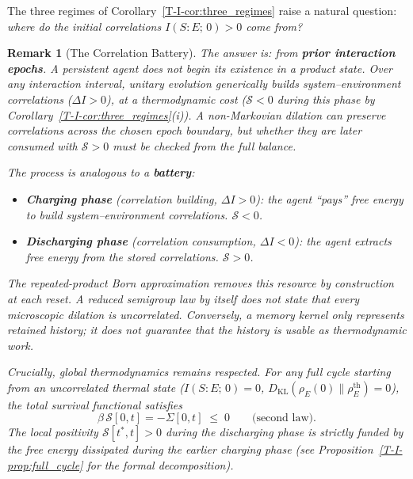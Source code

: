 \documentclass[12pt,a4paper,openany]{book}
\newtheorem{remark}[theorem]{Remark}
\begin{document}
The three regimes of Corollary~\ref{T-I-cor:three_regimes} raise a
natural question: \emph{where do the initial correlations
$I(S{:}E;\, 0) > 0$ come from?}

\begin{remark}[The Correlation Battery]
\label{T-I-rem:battery}
The answer is: from \textbf{prior interaction epochs}.
A persistent agent does not begin its existence in a product
state.
Over any interaction interval, unitary evolution generically
builds system--environment correlations ($\Delta I > 0$),
at a thermodynamic cost ($\mathcal{S} < 0$ during this
phase by Corollary~\ref{T-I-cor:three_regimes}(i)).
A non-Markovian dilation can preserve correlations across the chosen
epoch boundary, but whether they are later consumed with
$\mathcal S>0$ must be checked from the full balance.

The process is analogous to a \textbf{battery}:
\begin{itemize}
\item \textbf{Charging phase}
  (correlation building, $\Delta I > 0$):
  the agent ``pays'' free energy to build
  system--environment correlations.
  $\mathcal{S} < 0$.
\item \textbf{Discharging phase}
  (correlation consumption, $\Delta I < 0$):
  the agent extracts free energy from the stored
  correlations.
  $\mathcal{S} > 0$.
\end{itemize}
The repeated-product Born approximation removes this resource by
construction at each reset.  A reduced semigroup law by itself does not
state that every microscopic dilation is uncorrelated.  Conversely, a
memory kernel only represents retained history; it does not guarantee
that the history is usable as thermodynamic work.

Crucially, global thermodynamics remains respected.
For any full cycle starting from an uncorrelated thermal
state ($I(S{:}E;\,0) = 0$,
$D_{\mathrm{KL}}(\rho_E(0)\|\rho_E^{\mathrm{th}}) = 0$),
the total survival functional satisfies
\begin{equation}
\label{T-I-eq:battery_closure}
\beta\,\mathcal{S}[0, t]
= -\Sigma[0, t] \;\leq\; 0
\qquad\text{(second law).}
\end{equation}
The local positivity $\mathcal{S}[t^*, t] > 0$ during the
discharging phase is strictly funded by the free energy
dissipated during the earlier charging phase
(see Proposition~\ref{T-I-prop:full_cycle} for the formal
decomposition).
\end{remark}
\end{document}
